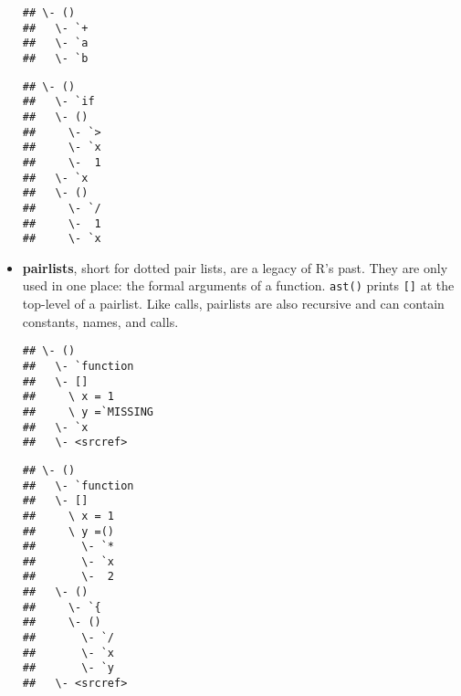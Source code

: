 \begin{itemize}
\begin{verbatim}
## \- ()
##   \- `+
##   \- `a
##   \- `b
\end{verbatim}

\begin{Shaded}
\begin{Highlighting}[]
\NormalTok{(}\OperatorTok{>}\StringTok{ } \OperatorTok{/}
\end{Highlighting}
\end{Shaded}

\begin{verbatim}
## \- ()
##   \- `if
##   \- ()
##     \- `>
##     \- `x
##     \-  1
##   \- `x
##   \- ()
##     \- `/
##     \-  1
##     \- `x
\end{verbatim}
\item
  \textbf{pairlists}, short for dotted pair lists, are a legacy of R's
  past. They are only used in one place: the formal arguments of a
  function. \texttt{ast()} prints \texttt{{[}{]}} at the top-level of a
  pairlist. Like calls, pairlists are also recursive and can contain
  constants, names, and calls. 

\begin{Shaded}
\begin{Highlighting}[]
\NormalTok{(}\NormalTok{(} 
\end{Highlighting}
\end{Shaded}

\begin{verbatim}
## \- ()
##   \- `function
##   \- []
##     \ x = 1
##     \ y =`MISSING
##   \- `x
##   \- <srcref>
\end{verbatim}

\begin{Shaded}
\begin{Highlighting}[]
\NormalTok{(}\NormalTok{(} \NormalTok{, }\OperatorTok{*}\StringTok{ }\OperatorTok{/}\StringTok{ }
\end{Highlighting}
\end{Shaded}

\begin{verbatim}
## \- ()
##   \- `function
##   \- []
##     \ x = 1
##     \ y =()
##       \- `*
##       \- `x
##       \-  2
##   \- ()
##     \- `{
##     \- ()
##       \- `/
##       \- `x
##       \- `y
##   \- <srcref>
\end{verbatim}
\end{itemize}

